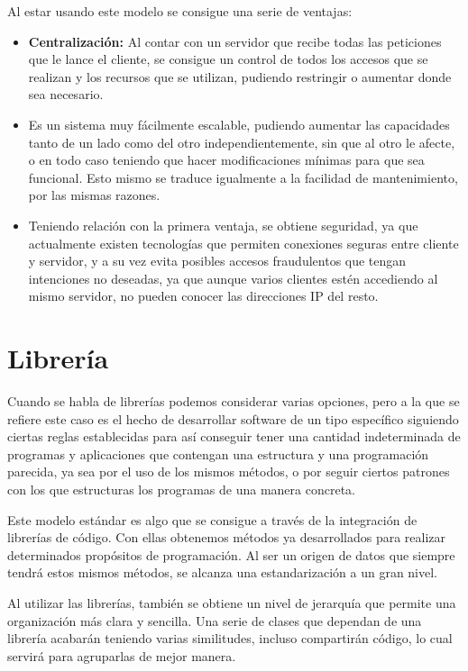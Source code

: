 Al estar usando este modelo se consigue una serie de ventajas:
\begin{itemize}
\item \textbf{Centralización:} Al contar con un servidor que recibe todas las peticiones que le lance el cliente, se consigue un control de todos los accesos que se realizan y los recursos que se utilizan, pudiendo restringir o aumentar donde sea necesario.
\item Es un sistema muy fácilmente escalable, pudiendo aumentar las capacidades tanto de un lado como del otro independientemente, sin que al otro le afecte, o en todo caso teniendo que hacer modificaciones mínimas para que sea funcional. Esto mismo se traduce igualmente a la facilidad de mantenimiento, por las mismas razones.
\item Teniendo relación con la primera ventaja, se obtiene seguridad, ya que actualmente existen tecnologías que permiten conexiones seguras entre cliente y servidor, y a su vez evita posibles accesos fraudulentos que tengan intenciones no deseadas, ya que aunque varios clientes estén accediendo al mismo servidor, no pueden conocer las direcciones IP del resto. 
\end{itemize}

\section{Librería}

Cuando se habla de librerías \cite{lib1} \cite{lib2} podemos considerar varias opciones, pero a la que se refiere este caso es el hecho de desarrollar software de un tipo específico siguiendo ciertas reglas establecidas para así conseguir tener una cantidad indeterminada de programas y aplicaciones que contengan una estructura y una programación parecida, ya sea por el uso de los mismos métodos, o por seguir ciertos patrones con los que estructuras los programas de una manera concreta.

Este modelo estándar es algo que se consigue a través de la integración de librerías de código. Con ellas obtenemos métodos ya desarrollados para realizar determinados propósitos de programación. Al ser un origen de datos que siempre tendrá estos mismos métodos, se alcanza una estandarización a un gran nivel.

Al utilizar las librerías, también se obtiene un nivel de jerarquía que permite una organización más clara y sencilla. Una serie de clases que dependan de una librería acabarán teniendo varias similitudes, incluso compartirán código, lo cual servirá para agruparlas de mejor manera.

